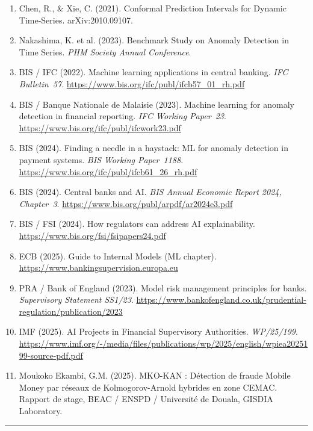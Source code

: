 \documentclass[12pt,a4paper]{article}
\begin{document}
\begin{enumerate}
\item[] Chen, R., \& Xie, C. (2021). Conformal Prediction Intervals for Dynamic
Time-Series. arXiv:2010.09107.

\item[] Nakashima, K. et al. (2023). Benchmark Study on Anomaly Detection in
Time Series. \textit{PHM Society Annual Conference}.

\item[] BIS / IFC (2022). Machine learning applications in central banking.
\textit{IFC Bulletin~57}.
\url{https://www.bis.org/ifc/publ/ifcb57\_01\_rh.pdf}

\item[] BIS / Banque Nationale de Malaisie (2023). Machine learning for anomaly
detection in financial reporting. \textit{IFC Working Paper~23}.
\url{https://www.bis.org/ifc/publ/ifcwork23.pdf}

\item[] BIS (2024). Finding a needle in a haystack: ML for anomaly detection in
payment systems. \textit{BIS Working Paper~1188}.
\url{https://www.bis.org/ifc/publ/ifcb61\_26\_rh.pdf}

\item[] BIS (2024). Central banks and AI. \textit{BIS Annual Economic Report
2024, Chapter~3}.
\url{https://www.bis.org/publ/arpdf/ar2024e3.pdf}

\item[] BIS / FSI (2024). How regulators can address AI explainability.
\url{https://www.bis.org/fsi/fsipapers24.pdf}

\item[] ECB (2025). Guide to Internal Models (ML chapter).
\url{https://www.bankingsupervision.europa.eu}

\item[] PRA / Bank of England (2023). Model risk management principles for
banks. \textit{Supervisory Statement SS1/23}.
\url{https://www.bankofengland.co.uk/prudential-regulation/publication/2023}

\item[] IMF (2025). AI Projects in Financial Supervisory Authorities.
\textit{WP/25/199}.
\url{https://www.imf.org/-/media/files/publications/wp/2025/english/wpiea2025199-source-pdf.pdf}

\item[] Moukoko Ekambi, G.M. (2025). MKO-KAN : Détection de fraude Mobile Money
par réseaux de Kolmogorov-Arnold hybrides en zone CEMAC. Rapport de stage,
BEAC / ENSPD / Université de Douala, GISDIA Laboratory.

\end{enumerate}

\vspace{2cm}
\hrule
\vspace{0.5cm}
\end{document}

